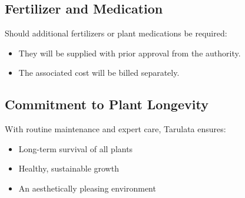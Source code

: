 \documentclass[12pt,a4paper]{article}
\begin{document}
\subsection*{Fertilizer and Medication}
Should additional fertilizers or plant medications be required:
\begin{itemize}
  \item They will be supplied with prior approval from the authority.
  \item The associated cost will be billed separately.
\end{itemize}

\subsection*{Commitment to Plant Longevity}
With routine maintenance and expert care, Tarulata ensures:
\begin{itemize}
  \item Long-term survival of all plants
  \item Healthy, sustainable growth
  \item An aesthetically pleasing environment
\end{itemize}
\end{document}
